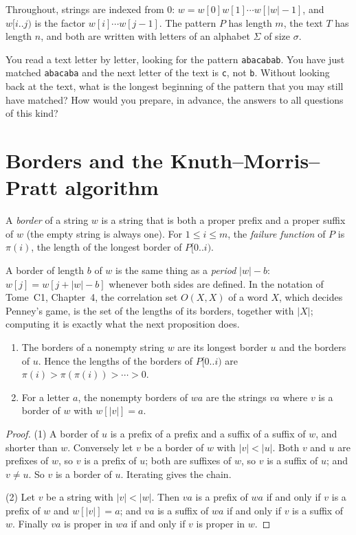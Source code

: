 Throughout, strings are indexed from $0$: $w=w[0]w[1]\cdots w[|w|-1]$, and $w[i..j)$ is the factor $w[i]\cdots w[j-1]$. The pattern $P$ has length $m$, the text $T$ has length $n$, and both are written with letters of an alphabet $\Sigma$ of size $\sigma$.

\begin{think}
You read a text letter by letter, looking for the pattern \texttt{abacabab}. You have just matched \texttt{abacaba} and the next letter of the text is \texttt{c}, not \texttt{b}. Without looking back at the text, what is the longest beginning of the pattern that you may still have matched? How would you prepare, in advance, the answers to all questions of this kind?
\end{think}

\section{Borders and the Knuth--Morris--Pratt algorithm}\label{sec:kmp}

\begin{definition}
A \emph{border} of a string $w$ is a string that is both a proper prefix and a proper suffix of $w$ (the empty string is always one). For $1\le i\le m$, the \emph{failure function} of $P$ is $\pi(i)$, the length of the longest border of $P[0..i)$.
\end{definition}

A border of length $b$ of $w$ is the same thing as a \emph{period} $|w|-b$: $w[j]=w[j+|w|-b]$ whenever both sides are defined. In the notation of Tome~C1, Chapter~4, the correlation set $O(X,X)$ of a word $X$, which decides Penney's game, is the set of the lengths of its borders, together with $|X|$; computing it is exactly what the next proposition does.

\begin{lemma}\label{lem:borderchain}
\begin{enumerate}
\item The borders of a nonempty string $w$ are its longest border $u$ and the borders of $u$. Hence the lengths of the borders of $P[0..i)$ are $\pi(i)>\pi(\pi(i))>\cdots>0$.
\item For a letter $a$, the nonempty borders of $wa$ are the strings $va$ where $v$ is a border of $w$ with $w[|v|]=a$.
\end{enumerate}
\end{lemma}
\begin{proof}
(1) A border of $u$ is a prefix of a prefix and a suffix of a suffix of $w$, and shorter than $w$. Conversely let $v$ be a border of $w$ with $|v|<|u|$. Both $v$ and $u$ are prefixes of $w$, so $v$ is a prefix of $u$; both are suffixes of $w$, so $v$ is a suffix of $u$; and $v\ne u$. So $v$ is a border of $u$. Iterating gives the chain.

(2) Let $v$ be a string with $|v|<|w|$. Then $va$ is a prefix of $wa$ if and only if $v$ is a prefix of $w$ and $w[|v|]=a$; and $va$ is a suffix of $wa$ if and only if $v$ is a suffix of $w$. Finally $va$ is proper in $wa$ if and only if $v$ is proper in $w$.
\end{proof}

